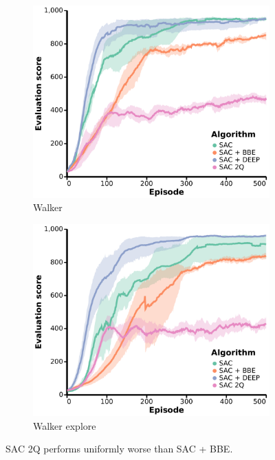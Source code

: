 \begin{subappendices}
\begin{figure}[h]
\begin{subfigure}[b]{0.24\textwidth}
        \centering
        \includegraphics[width=\textwidth]{figures/deep/neurips_SAC2Q_walker.pdf}
        \caption{Walker}
    \end{subfigure}
    \begin{subfigure}[b]{0.24\textwidth}
        \centering
        \includegraphics[width=\textwidth]{figures/deep/neurips_SAC2Q_walker_explore.pdf}
        \caption{Walker explore}
    \end{subfigure}
    \caption{SAC 2Q performs uniformly worse than SAC + BBE.}
\end{figure}
\end{subappendices}
\printendnotes